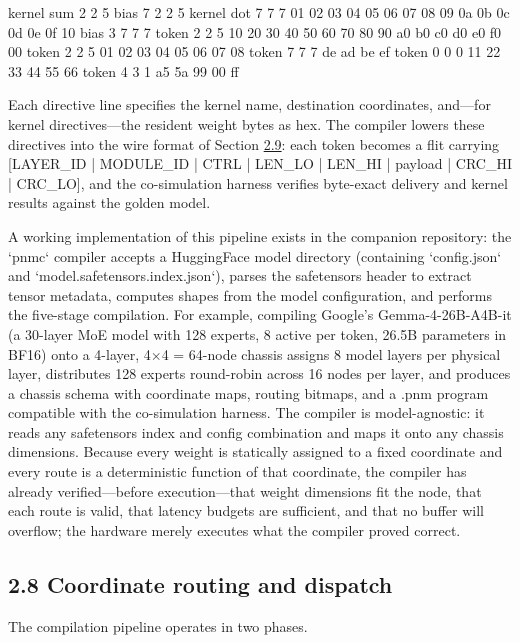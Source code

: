 \documentclass[12pt,onecolumn]{article}
\begin{document}
kernel sum 2 2 5
bias   7 2 2 5
kernel dot 7 7 7 01 02 03 04 05 06 07 08 09 0a 0b 0c 0d 0e 0f 10
bias   3 7 7 7
token 2 2 5   10 20 30 40 50 60 70 80 90 a0 b0 c0 d0 e0 f0 00
token 2 2 5   01 02 03 04 05 06 07 08
token 7 7 7   de ad be ef
token 0 0 0   11 22 33 44 55 66
token 4 3 1   a5 5a 99 00 ff

Each directive line specifies the kernel name, destination coordinates, and---for kernel directives---the resident weight bytes as hex. The compiler lowers these directives into the wire format of Section \hyperref[sec:2.9]{2.9}: each token becomes a flit carrying [LAYER\_ID | MODULE\_ID | CTRL | LEN\_LO | LEN\_HI | payload | CRC\_HI | CRC\_LO], and the co-simulation harness verifies byte-exact delivery and kernel results against the golden model.

A working implementation of this pipeline exists in the companion repository: the `pnmc` compiler accepts a HuggingFace model directory (containing `config.json` and `model.safetensors.index.json`), parses the safetensors header to extract tensor metadata, computes shapes from the model configuration, and performs the five-stage compilation. For example, compiling Google's Gemma-4-26B-A4B-it (a 30-layer MoE model with 128 experts, 8 active per token, 26.5B parameters in BF16) onto a 4-layer, 4$\times$4 = 64-node chassis assigns 8 model layers per physical layer, distributes 128 experts round-robin across 16 nodes per layer, and produces a chassis schema with coordinate maps, routing bitmaps, and a .pnm program compatible with the co-simulation harness. The compiler is model-agnostic: it reads any safetensors index and config combination and maps it onto any chassis dimensions. Because every weight is statically assigned to a fixed coordinate and every route is a deterministic function of that coordinate, the compiler has already verified---before execution---that weight dimensions fit the node, that each route is valid, that latency budgets are sufficient, and that no buffer will overflow; the hardware merely executes what the compiler proved correct.

\subsection*{2.8 Coordinate routing and dispatch}\label{sec:2.8}

The compilation pipeline operates in two phases.
\end{document}
